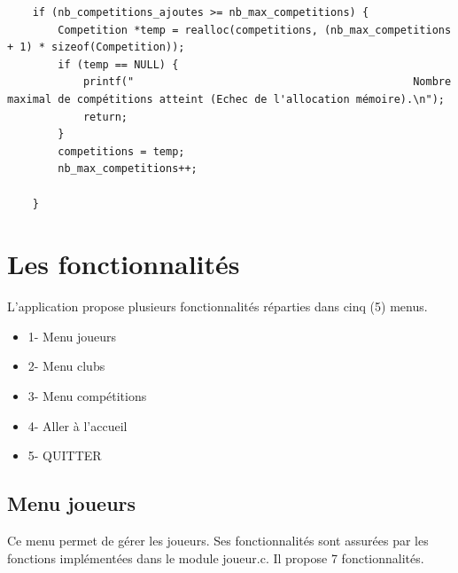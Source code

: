 \documentclass[12pt,a4paper]{report}
\begin{document}
\begin{lstlisting}
	if (nb_competitions_ajoutes >= nb_max_competitions) {
		Competition *temp = realloc(competitions, (nb_max_competitions + 1) * sizeof(Competition));
		if (temp == NULL) {
			printf("                                            Nombre maximal de compétitions atteint (Echec de l'allocation mémoire).\n");
			return;
		}
		competitions = temp;
		nb_max_competitions++;
		
	}
\end{lstlisting}

\chapter{Les fonctionnalités}
L'application propose plusieurs fonctionnalités réparties dans cinq (5) menus.

\begin{itemize}
	\item 1- Menu joueurs
	\item 2- Menu clubs
	\item 3- Menu compétitions
	\item 4- Aller à l'accueil
	\item 5- QUITTER
\end{itemize}
\section{Menu joueurs}
Ce menu permet de gérer les joueurs. Ses fonctionnalités sont assurées par les fonctions implémentées dans le module joueur.c. Il propose 7 fonctionnalités.
\end{document}

